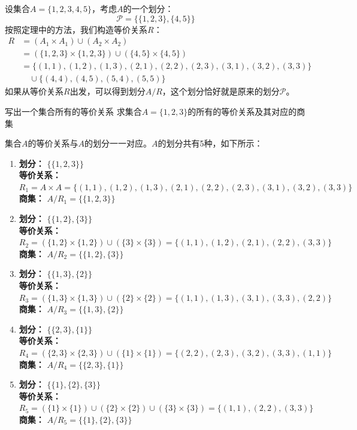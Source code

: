 设集合$A = \{1, 2, 3, 4, 5\}$，考虑$A$的一个划分：
\[
\mathcal{P} = \{\{1, 2, 3\}, \{4, 5\}\}
\]
按照定理中的方法，我们构造等价关系$R$：
\begin{align*}
R &= (A_1 \times A_1) \cup (A_2 \times A_2) \\
  &= (\{1,2,3\} \times \{1,2,3\}) \cup (\{4,5\} \times \{4,5\}) \\
  &= \{(1,1),(1,2),(1,3),(2,1),(2,2),(2,3),(3,1),(3,2),(3,3)\} \\
  &\quad \cup \{(4,4),(4,5),(5,4),(5,5)\}
\end{align*}
如果从等价关系$R$出发，可以得到划分$A/R$，这个划分恰好就是原来的划分$\mathcal{P}$。
\begin{example}{写出一个集合所有的等价关系}{}
    求集合$A = \{1, 2, 3\}$的所有的等价关系及其对应的商集
\end{example}
集合$A$的等价关系与$A$的划分一一对应。$A$的划分共有5种，如下所示：
\begin{enumerate}
    \item \textbf{划分：} $\{\{1,2,3\}\}$ \\
          \textbf{等价关系：} $R_1 = A \times A = \{(1,1),(1,2),(1,3),(2,1),(2,2),(2,3),(3,1),(3,2),(3,3)\}$ \\
          \textbf{商集：} $A/R_1 = \{\{1,2,3\}\}$

    \item \textbf{划分：} $\{\{1,2\}, \{3\}\}$ \\
          \textbf{等价关系：} $R_2 = (\{1,2\} \times \{1,2\}) \cup (\{3\} \times \{3\}) = \{(1,1),(1,2),(2,1),(2,2),(3,3)\}$ \\
          \textbf{商集：} $A/R_2 = \{\{1,2\}, \{3\}\}$

    \item \textbf{划分：} $\{\{1,3\}, \{2\}\}$ \\
          \textbf{等价关系：} $R_3 = (\{1,3\} \times \{1,3\}) \cup (\{2\} \times \{2\})= \{(1,1),(1,3),(3,1),(3,3),(2,2)\}$ \\
          \textbf{商集：} $A/R_3 = \{\{1,3\}, \{2\}\}$

    \item \textbf{划分：} $\{\{2,3\}, \{1\}\}$ \\
          \textbf{等价关系：} $R_4 = (\{2,3\} \times \{2,3\}) \cup (\{1\} \times \{1\})= \{(2,2),(2,3),(3,2),(3,3),(1,1)\}$ \\
          \textbf{商集：} $A/R_4 = \{\{2,3\}, \{1\}\}$

    \item \textbf{划分：} $\{\{1\}, \{2\}, \{3\}\}$ \\
          \textbf{等价关系：} $R_5 = (\{1\} \times \{1\}) \cup (\{2\} \times \{2\}) \cup (\{3\} \times \{3\})= \{(1,1),(2,2),(3,3)\}$ \\
          \textbf{商集：} $A/R_5 = \{\{1\}, \{2\}, \{3\}\}$
\end{enumerate}
